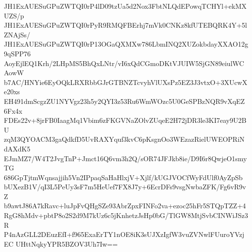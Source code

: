JH1ExAUESuGPuZWTQI0rP4lD09tzUa5d2Nox3FbtNLQdEPowqTCHYl+ekMXUZS/p
JH1ExAUESuGPuZWTQI0rPyR9RMQFBErhj7mVk0CNKz8kfUTEBQRK4Y+5lZNAjSs/
JH1ExAUESuGPuZWTQI0rP13OGaQXMXw786LbmINQ2XUZokbdayXXAO12g9qSPP76
AoyEjlEQ1Krh/2LHpMS5BhQxLNtr/vI6xQdCGmoDKtVJUIW5SjGN89eiulWCAowW
b7AC/HNYie6EyOQkLRXRbbGJrGTBNZTcvyhVlUXsPz5EZ3J3vtxO+3XUcwXe20xs
EH491dmScgzZU1NYVgz23h5y2QYI3z53Ru6WmWOzc5U0GeSPBzNQR9vXqEZ6Fx4x
FDEs22v+8jrFB0IaagMq1Vbim6zFKGVNaZOlvZUqeE2H72jDR3le3KI7eay9U2BU
zqM3QYOACM3gaQdkfD5UvRAXYquf3kvC6pKsgnOo3WEzazRielUWEOPRiNdAXdK5
EJmMZ7/W4T2JvgTnP+Jmct16Q6vm3h2Q/sOR74JFJkb8ie/D9I6r8QwjeO1smyTG
686GpTjtmWqnsajjih5Vn2IPpaqSaHaHlxjV+Xjlf/kUGJVOCfWyFdUlf0AyZpSb
bUXezB1V/qI3L5PeUy3sF7m5HeUef7FX8J7y+6EcrDFs9vsgNwbaZFK/Fg6vR9vZ
b9awtJ86A7kRavc+luJpFvQHgSZe93AbrZpxFINFo2va+ezoc25hFr5STQpTZZ+4
RgG8hMdv+pbtP8o2S2d9M7kUz6c5jKnhetzJsHp0bG/TlGW8MtjSvbCINWiJSz3R
P4nAzGLL2DEuzEfI+f965ExaErTY1nOE8iK3sUJXzIgfW3vuZVNwlFUuroYVzjEC
UHttNqkyYPR5BZOV3Uh7Iw==
